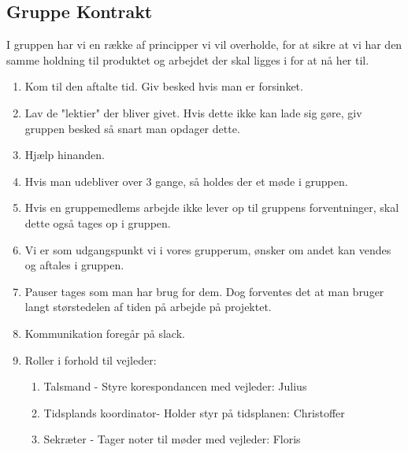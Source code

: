 
\subsection{Gruppe Kontrakt}
I gruppen har vi en række af principper vi vil overholde, for at sikre at vi har den samme holdning til produktet og arbejdet der skal ligges i for at nå her til.
\begin{enumerate}
	\item Kom til den aftalte tid. Giv besked hvis man er forsinket.
	\item Lav de "lektier" der bliver givet. Hvis dette ikke kan lade sig 		gøre, giv gruppen besked så snart man opdager dette.
	\item Hjælp hinanden.
	\item Hvis man udebliver over 3 gange, så holdes der et møde i gruppen.
	\item Hvis en gruppemedlems arbejde ikke lever op til gruppens forventninger, skal dette også tages op i gruppen.
	\item Vi er som udgangspunkt vi i vores grupperum, ønsker om andet kan vendes og aftales i gruppen.
	\item Pauser tages som man har brug for dem. Dog forventes det at man bruger langt størstedelen af tiden på arbejde på projektet. 
	\item Kommunikation foregår på slack.
	\item Roller i forhold til vejleder:
	\begin{enumerate}
	    \item Talsmand - Styre korespondancen med vejleder: Julius
	    \item Tidsplands koordinator- Holder styr på tidsplanen: Christoffer
	    \item Sekræter - Tager noter til møder med vejleder: Floris
	\end{enumerate}
\end{enumerate}